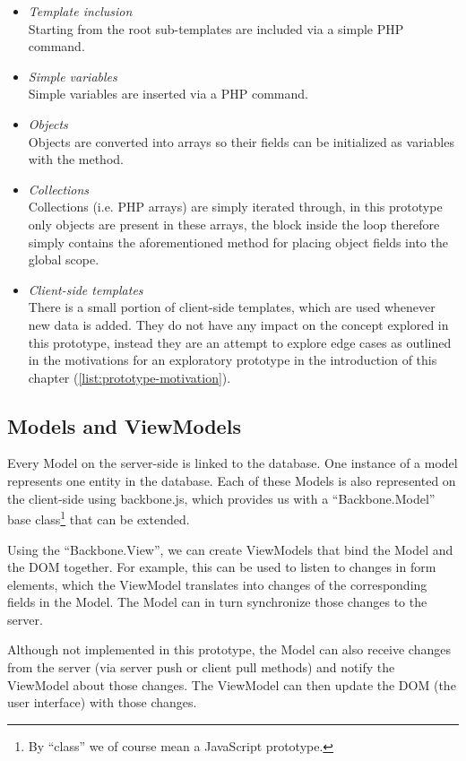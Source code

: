 \documentclass[thesis.tex]{subfiles}
\begin{document}
\begin{itemize}
	\item \emph{Template inclusion}\\
	Starting from the root sub-templates are included via a simple
	PHP  command.
	\item \emph{Simple variables}\\
	Simple variables are inserted via a PHP  command.
	\item \emph{Objects}\\
	Objects are converted into arrays so their fields can be initialized as
	variables with the  method.
	\item \emph{Collections}\\
	Collections (i.e. PHP arrays) are simply iterated through, in this prototype
	only objects are present in these arrays, the block inside the
	 loop therefore simply contains the aforementioned method
	for placing object fields into the global scope.
	\item \emph{Client-side templates}\\
	There is a small portion of client-side templates, which are used whenever new
	data is added.  They do not have any impact on the concept explored in
	this prototype, instead they are an attempt to explore edge cases as outlined
	in the motivations for an exploratory prototype in the introduction of this
	chapter (\ref{list:prototype-motivation}).
\end{itemize}

\subsection{Models and ViewModels}
Every Model on the server-side is linked to the database.
One instance of a model represents one entity in the database.
Each of these Models is also represented on the client-side using backbone.js,
which provides us with a ``Backbone.Model'' base class\footnote{
	By ``class'' we of course mean a JavaScript prototype.
} that can be extended.

Using the ``Backbone.View'', we can create ViewModels that bind the Model and the
DOM together. For example, this can be used to listen to changes in
form elements, which the ViewModel translates into changes of the corresponding
fields in the Model. The Model can in turn synchronize those changes to the
server.

Although not implemented in this prototype, the Model can also receive changes
from the server (via server push or client pull methods) and notify
the ViewModel about those changes. The ViewModel can then update the
DOM (the user interface) with those changes.
\end{document}
